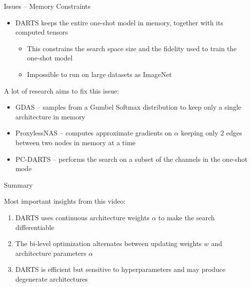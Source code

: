 \documentclass[main]{subfiles}
\begin{document}
\begin{frame}{Issues -- Memory Constraints}
\begin{itemize}
    \item DARTS keeps the \alert{entire one-shot model in memory}, together with its computed tensors 
    \begin{itemize}
        \item  This constrains the search space size and the fidelity used to train the one-shot model
        \item \alert{Impossible} to run on large datasets as ImageNet
    \end{itemize}
\end{itemize}

A lot of research aims to fix this issue:
\begin{itemize}
    \item \alert{GDAS}  -- samples from a Gumbel Softmax distribution to keep only a single architecture in memory
    \item \alert{ProxylessNAS}  -- computes approximate gradients on $\alpha$ keeping only 2 edges between two nodes in memory at a time 
    \item \alert{PC-DARTS}  -- performs the search on a subset of the channels in the one-shot mode
\end{itemize}
\end{frame}


\begin{frame}{Summary}
    
Most important insights from this video:

\begin{enumerate}
\item DARTS uses continuous architecture weights $\alpha$ to make the search differentiable
\item The bi-level optimization alternates between updating weights $w$ and architecture parameters $\alpha$
\item DARTS is efficient but sensitive to hyperparameters and may produce degenerate architectures
\end{enumerate}
\end{frame}
\end{document}
